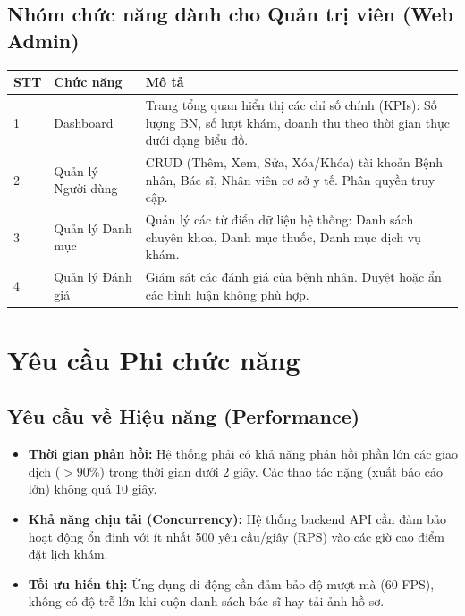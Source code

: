 \documentclass[12pt,a4paper]{article}
\begin{document}
\subsection{Nhóm chức năng dành cho Quản trị viên (Web Admin)}

\begin{longtable}{|p{1cm}|p{4.5cm}|p{9.5cm}|}
\hline
\textbf{STT} & \textbf{Chức năng} & \textbf{Mô tả} \\
\hline
\endhead

1 & Dashboard & Trang tổng quan hiển thị các chỉ số chính (KPIs): Số lượng BN, số lượt khám, doanh thu theo thời gian thực dưới dạng biểu đồ. \\
\hline
2 & Quản lý Người dùng & CRUD (Thêm, Xem, Sửa, Xóa/Khóa) tài khoản Bệnh nhân, Bác sĩ, Nhân viên cơ sở y tế. Phân quyền truy cập. \\
\hline
3 & Quản lý Danh mục & Quản lý các từ điển dữ liệu hệ thống: Danh sách chuyên khoa, Danh mục thuốc, Danh mục dịch vụ khám. \\
\hline
4 & Quản lý Đánh giá & Giám sát các đánh giá của bệnh nhân. Duyệt hoặc ẩn các bình luận không phù hợp. \\
\hline
\end{longtable}

\newpage

\section{Yêu cầu Phi chức năng}

\subsection{Yêu cầu về Hiệu năng (Performance)}
\begin{itemize}
    \item \textbf{Thời gian phản hồi:} Hệ thống phải có khả năng phản hồi phần lớn các giao dịch ($> 90\%$) trong thời gian dưới 2 giây. Các thao tác nặng (xuất báo cáo lớn) không quá 10 giây.
    \item \textbf{Khả năng chịu tải (Concurrency):} Hệ thống backend API cần đảm bảo hoạt động ổn định với ít nhất 500 yêu cầu/giây (RPS) vào các giờ cao điểm đặt lịch khám.
    \item \textbf{Tối ưu hiển thị:} Ứng dụng di động cần đảm bảo độ mượt mà (60 FPS), không có độ trễ lớn khi cuộn danh sách bác sĩ hay tải ảnh hồ sơ.
\end{itemize}
\end{document}
